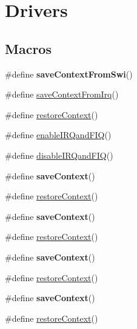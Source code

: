 \hypertarget{group___drivers}{\section{Drivers}
\label{group___drivers}
}
\subsection*{Macros}
\begin{DoxyCompactItemize}
\item 
\#define {\bfseries save\-Context\-From\-Swi}()
\item 
\#define \hyperlink{group___drivers_ga5bc7a8d3a87aba81cecd73c4d0972449}{save\-Context\-From\-Irq}()
\item 
\#define \hyperlink{group___drivers_ga9c44075f57f61dc7b14637f1973776bc}{restore\-Context}()
\item 
\#define \hyperlink{group___drivers_gab1359cc5bc2531333baf9ef3e4718336}{enable\-I\-R\-Qand\-F\-I\-Q}()
\item 
\#define \hyperlink{group___drivers_ga21a05ff59779a634de98b1d3436fd608}{disable\-I\-R\-Qand\-F\-I\-Q}()
\item 
\#define {\bfseries save\-Context}()
\item 
\#define \hyperlink{group___drivers_ga9c44075f57f61dc7b14637f1973776bc}{restore\-Context}()
\item 
\#define {\bfseries save\-Context}()
\item 
\#define \hyperlink{group___drivers_ga9c44075f57f61dc7b14637f1973776bc}{restore\-Context}()
\item 
\#define {\bfseries save\-Context}()
\item 
\#define \hyperlink{group___drivers_ga9c44075f57f61dc7b14637f1973776bc}{restore\-Context}()
\item 
\#define {\bfseries save\-Context}()
\item 
\#define \hyperlink{group___drivers_ga9c44075f57f61dc7b14637f1973776bc}{restore\-Context}()
\end{DoxyCompactItemize}
